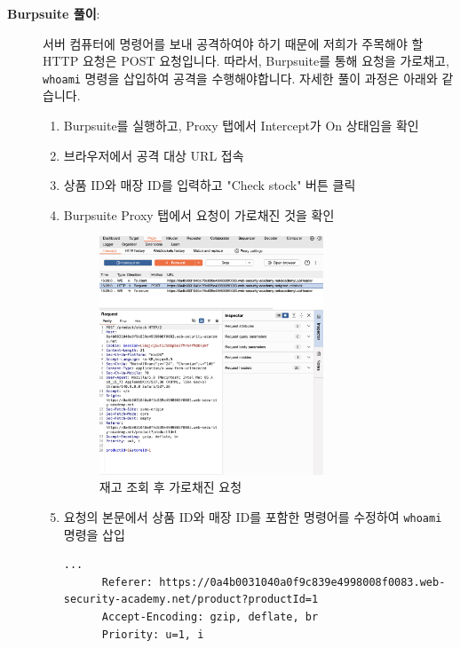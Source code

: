\documentclass{article}
\begin{document}
\begin{description}
    \item[\textbf{Burpsuite 풀이}:] \leavevmode\par
    서버 컴퓨터에 명령어를 보내 공격하여야 하기 때문에 저희가 주목해야 할 HTTP 요청은 POST 요청입니다.
    따라서, Burpsuite를 통해 요청을 가로채고, \texttt{whoami} 명령을 삽입하여 공격을 수행해야합니다.
    자세한 풀이 과정은 아래와 같습니다.
    \begin{enumerate}
      \item Burpsuite를 실행하고, Proxy 탭에서 Intercept가 On 상태임을 확인
      \item 브라우저에서 공격 대상 URL 접속
      \item 상품 ID와 매장 ID를 입력하고 "Check stock" 버튼 클릭
      \item Burpsuite Proxy 탭에서 요청이 가로채진 것을 확인
      
      \begin{figure}[htbp]
      \centering
      \includegraphics[width=0.7\textwidth]{../figure/figure1.png}
      \caption{재고 조회 후 가로채진 요청}
      \label{fig:stock-checker}
      \end{figure}

      \item 요청의 본문에서 상품 ID와 매장 ID를 포함한 명령어를 수정하여 \texttt{whoami} 명령을 삽입
      
      \begin{lstlisting}[label={lst:original-request},caption={원본 요청 (original request)}]
      ...
      Referer: https://0a4b0031040a0f9c839e4998008f0083.web-security-academy.net/product?productId=1
      Accept-Encoding: gzip, deflate, br
      Priority: u=1, i


\end{lstlisting}
\end{enumerate}
\end{description}
\end{document}

